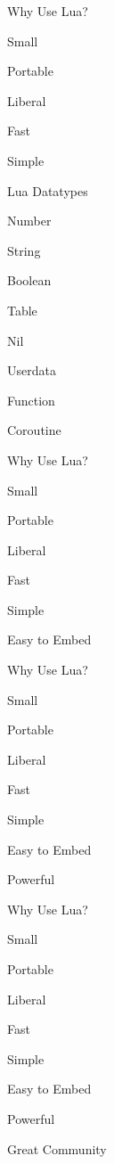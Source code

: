 \begin{itemslide}{Why Use Lua?}
\pause \item Small
\pause \item Portable
\pause \item Liberal %
\pause \item Fast
\pause \item Simple
\end{itemslide}


\begin{itemslide}{Lua Datatypes}
\item Number
\item String
\item Boolean
\item Table
\item Nil
\item Userdata
\item Function
\item Coroutine
\end{itemslide}

\begin{itemslide}{Why Use Lua?}
\item Small
\item Portable
\item Liberal %
\item Fast
\item Simple
\item Easy to Embed
\end{itemslide}


\begin{itemslide}{Why Use Lua?}
\item Small
\item Portable
\item Liberal %
\item Fast
\item Simple
\item Easy to Embed
\item Powerful
\end{itemslide}





\begin{itemslide}{Why Use Lua?}
\item Small
\item Portable
\item Liberal %
\item Fast
\item Simple
\item Easy to Embed
\item Powerful
\item Great Community
\end{itemslide}
